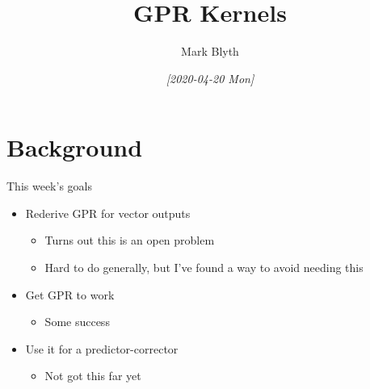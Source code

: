 \documentclass[presentation]{beamer}
\author{Mark Blyth}
\date{\textit{[2020-04-20 Mon]}}
\title{GPR Kernels}
\begin{document}
\maketitle

\section{Background}
\label{sec:org5796d9d}
\begin{frame}[label={sec:orga725be2}]{This week's goals}
\begin{itemize}
\item Rederive GPR for vector outputs
\begin{itemize}
\item Turns out this is an open problem
\item Hard to do generally, but I've found a way to avoid needing this
\end{itemize}
\item Get GPR to work
\begin{itemize}
\item Some success
\end{itemize}
\item Use it for a predictor-corrector
\begin{itemize}
\item Not got this far yet
\end{itemize}
\end{itemize}
\end{frame}
\end{document}
